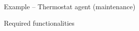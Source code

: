 \documentclass[presentation]{beamer}\mode<presentation>{\usetheme{AMSBolognaFC}}
\begin{document}
\begin{frame}[allowframebreaks]{Example -- Thermostat agent (maintenance)}
\begin{block}{Required functionalities}
\begin{enumerate}

        \end{enumerate}
    \end{block}
\end{frame}
\end{document}
